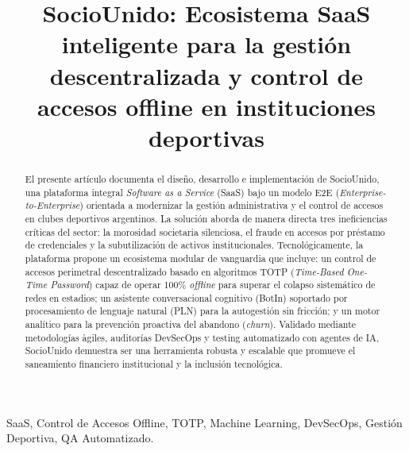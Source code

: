 \documentclass[conference, a4paper]{IEEEtran}
\begin{document}
\title{SocioUnido: Ecosistema SaaS inteligente para la gesti\'on descentralizada y control de accesos offline en instituciones deportivas}

\author{
}

\maketitle

\begin{abstract}
El presente art\'iculo documenta el dise\~no, desarrollo e implementaci\'on de SocioUnido, una plataforma integral \textit{Software as a Service} (SaaS) bajo un modelo E2E (\textit{Enterprise-to-Enterprise}) orientada a modernizar la gesti\'on administrativa y el control de accesos en clubes deportivos argentinos. La soluci\'on aborda de manera directa tres ineficiencias cr\'iticas del sector: la morosidad societaria silenciosa, el fraude en accesos por pr\'estamo de credenciales y la subutilizaci\'on de activos institucionales. Tecnol\'ogicamente, la plataforma propone un ecosistema modular de vanguardia que incluye: un control de accesos perimetral descentralizado basado en algoritmos TOTP (\textit{Time-Based One-Time Password}) capaz de operar 100\% \textit{offline} para superar el colapso sistem\'atico de redes en estadios; un asistente conversacional cognitivo (BotIn) soportado por procesamiento de lenguaje natural (PLN) para la autogesti\'on sin fricci\'on; y un motor anal\'itico para la prevenci\'on proactiva del abandono (\textit{churn}). Validado mediante metodolog\'ias \`agiles, auditor\'ias DevSecOps y testing automatizado con agentes de IA, SocioUnido demuestra ser una herramienta robusta y escalable que promueve el saneamiento financiero institucional y la inclusi\'on tecnol\'ogica.
\end{abstract}

\begin{IEEEkeywords}
SaaS, Control de Accesos Offline, TOTP, Machine Learning, DevSecOps, Gesti\'on Deportiva, QA Automatizado.
\end{IEEEkeywords}

\end{document}
